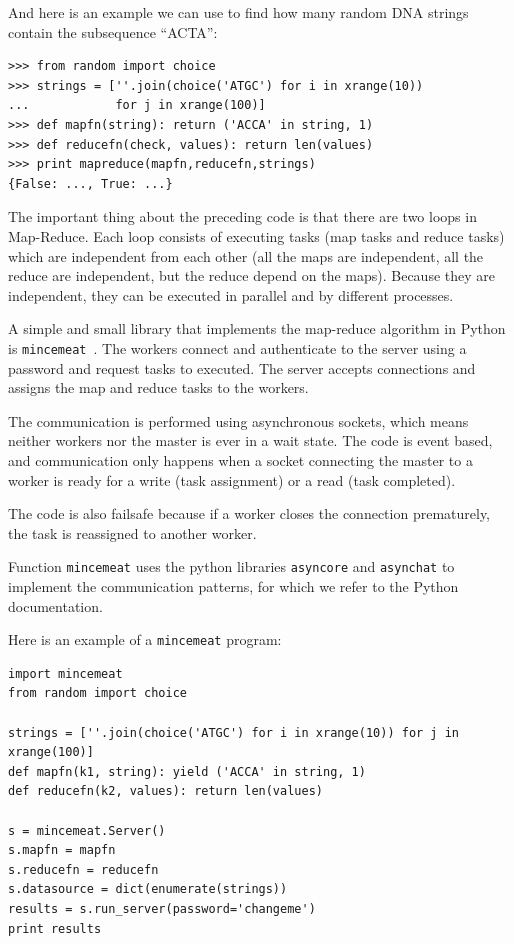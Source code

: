 \documentclass[justified,sixbynine]{tufte-book}
\def\ft{\small\tt}
\theoremstyle{plain}%
\theoremstyle{definition}
\theoremstyle{remark}
\begin{document}
\begin{fullwidth}
And here is an example we can use to find how many random DNA strings contain the subsequence ``ACTA'':

\begin{lstlisting}
>>> from random import choice
>>> strings = [''.join(choice('ATGC') for i in xrange(10))
...            for j in xrange(100)]
>>> def mapfn(string): return ('ACCA' in string, 1)
>>> def reducefn(check, values): return len(values)
>>> print mapreduce(mapfn,reducefn,strings)
{False: ..., True: ...}
\end{lstlisting}

The important thing about the preceding code is that there are two loops in Map-Reduce. Each loop consists of executing tasks (map tasks and reduce tasks) which are independent from each other (all the maps are independent, all the reduce are independent, but the reduce depend on the maps). Because they are independent, they can be executed in parallel and by different processes.

A simple and small library that implements the map-reduce algorithm in Python is {\ft mincemeat}~\cite{mincemeat}. The workers connect and authenticate to the server using a password and request tasks to executed. The server accepts connections and assigns the map and reduce tasks to the workers.

The communication is performed using asynchronous sockets, which means neither workers nor the master is ever in a wait state. The code is event based, and communication only happens when a socket connecting the master to a worker is ready for a write (task assignment) or a read (task completed).

The code is also failsafe because if a worker closes the connection prematurely, the task is reassigned to another worker.

Function {\ft mincemeat} uses the python libraries {\ft asyncore} and {\ft asynchat} to implement the communication patterns, for which we refer to the Python documentation.

Here is an example of a {\ft mincemeat} program:

\begin{lstlisting}
import mincemeat
from random import choice

strings = [''.join(choice('ATGC') for i in xrange(10)) for j in xrange(100)]
def mapfn(k1, string): yield ('ACCA' in string, 1)
def reducefn(k2, values): return len(values)

s = mincemeat.Server()
s.mapfn = mapfn
s.reducefn = reducefn
s.datasource = dict(enumerate(strings))
results = s.run_server(password='changeme')
print results
\end{lstlisting}


\end{fullwidth}
\end{document}
